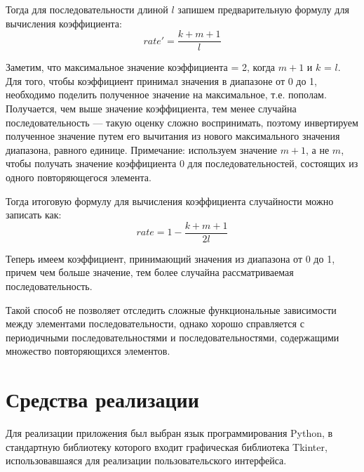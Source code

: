 \documentclass[12pt]{report}
\begin{document}
Тогда для последовательности длиной $l$ запишем предварительную формулу для вычисления коэффициента:
\begin{equation}
    rate' = \frac{k+m+1}{l} 
\end{equation}

Заметим, что максимальное значение коэффициента = 2, когда $m+1$ и $k$ = $l$. Для того, чтобы коэффициент принимал значения в диапазоне от 0 до 1, необходимо поделить полученное значение на максимальное, т.е. пополам. Получается, чем выше значение коэффициента, тем менее случайна последовательность --- такую оценку сложно воспринимать, поэтому инвертируем полученное значение путем его вычитания из нового максимального значения диапазона, равного единице. 
Примечание: используем значение $m+1$, а не $m$, чтобы получать значение коэффициента 0 для последовательностей, состоящих из одного повторяющегося элемента.

Тогда итоговую формулу для вычисления коэффициента случайности можно записать как:
\begin{equation}
    rate = 1-\frac{k+m+1}{2l} 
\end{equation}


Теперь имеем коэффициент, принимающий значения из диапазона от 0 до 1, причем чем больше значение, тем более случайна рассматриваемая последовательность.

Такой способ не позволяет отследить сложные функциональные зависимости между элементами последовательности, однако хорошо справляется с периодичными последовательностями и последовательностями, содержащими множество повторяющихся элементов.

\section*{Средства реализации}

Для реализации приложения был выбран язык программирования Python, в стандартную библиотеку которого входит графическая библиотека Tkinter, использовавшаяся для реализации пользовательского интерфейса.

\clearpage
\end{document}
